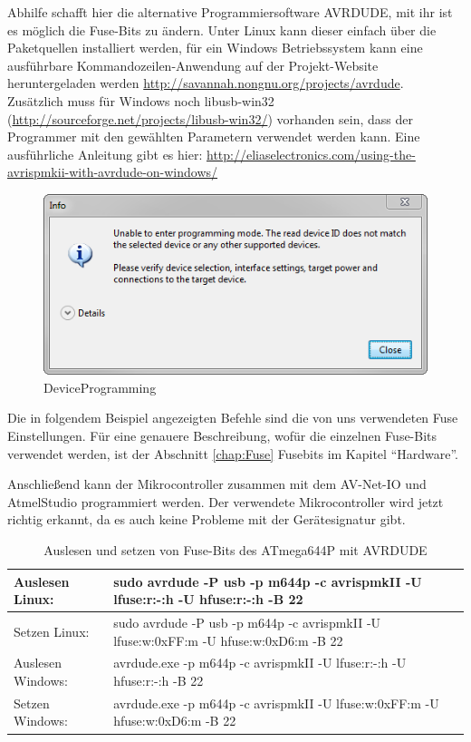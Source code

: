 Abhilfe schafft hier die alternative Programmiersoftware AVRDUDE, mit ihr ist
es möglich die Fuse-Bits zu ändern. Unter Linux kann dieser einfach über die
Paketquellen installiert werden, für ein Windows Betriebssystem kann eine
ausführbare Kommandozeilen-Anwendung auf der Projekt-Website heruntergeladen
werden \url{http://savannah.nongnu.org/projects/avrdude}. Zusätzlich muss für
Windows noch libusb-win32 (\url{http://sourceforge.net/projects/libusb-win32/})
vorhanden sein, dass der Programmer mit den gewählten Parametern verwendet werden
kann. Eine ausführliche Anleitung gibt es hier:
\url{http://eliaselectronics.com/using-the-avrispmkii-with-avrdude-on-windows/}

\begin{figure}[H]
\centering
\includegraphics[width=13cm]{content/pictures/Anleitung/neuerProzessor/AnleitungNeuerProzessor2_fehler.png}
\caption{DeviceProgramming}
\label{Einrichten.error}
\end{figure}

Die in folgendem Beispiel angezeigten Befehle sind die von uns verwendeten Fuse
Einstellungen. Für eine genauere Beschreibung, wofür die einzelnen Fuse-Bits
verwendet werden, ist der Abschnitt \ref{chap:Fuse} Fusebits im Kapitel 
"`Hardware"'.

Anschließend kann der Mikrocontroller zusammen mit dem AV-Net-IO und AtmelStudio
programmiert werden. Der verwendete Mikrocontroller wird jetzt richtig erkannt,
da es auch keine Probleme mit der Gerätesignatur gibt.

\begin{table}[H]
\begin{tabular}{| p{} | p{} |}
\hline
Auslesen Linux:& sudo avrdude -P usb -p m644p -c avrispmkII  -U lfuse:r:-:h -U hfuse:r:-:h -B 22 \\ \hline
Setzen Linux:& sudo avrdude -P usb -p m644p -c avrispmkII -U lfuse:w:0xFF:m -U hfuse:w:0xD6:m -B 22 \\ \hline
Auslesen Windows:& avrdude.exe -p m644p -c avrispmkII -U lfuse:r:-:h -U hfuse:r:-:h -B 22 \\ \hline 
Setzen Windows:& avrdude.exe -p m644p -c avrispmkII -U lfuse:w:0xFF:m -U hfuse:w:0xD6:m -B 22 \\ \hline
\end{tabular}
\caption{Auslesen und setzen von Fuse-Bits des ATmega644P mit AVRDUDE}
\label{ParameterAvrdude1}
\end{table}


